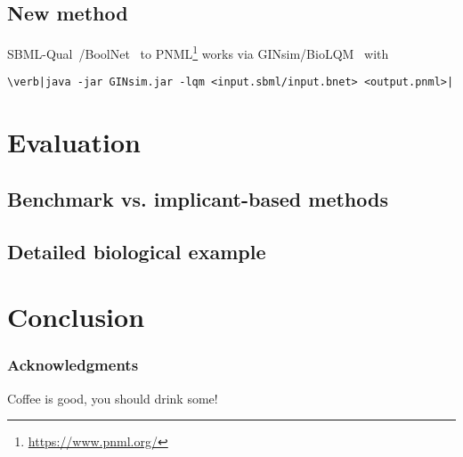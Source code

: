 \documentclass[runningheads]{llncs}
\begin{document}
\subsection{New method}

SBML-Qual~\cite{chaouiya2013sbml}/BoolNet~\cite{mussel2010boolnet,klarner2017pyboolnet} to PNML\footnote{\url{https://www.pnml.org/}} works via GINsim/BioLQM~\cite{chaouiya2012logical} with
\begin{verbatim}
\verb|java -jar GINsim.jar -lqm <input.sbml/input.bnet> <output.pnml>|
\end{verbatim}

\section{Evaluation}
\subsection{Benchmark vs. implicant-based methods}
\subsection{Detailed biological example}

\section{Conclusion}

\subsubsection{Acknowledgments}
Coffee is good, you should drink some!



\end{document}
